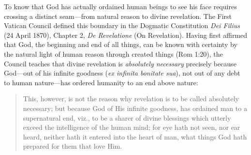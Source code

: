 To know that God has actually ordained human beings to see his face requires crossing a distinct seam---from natural reason to divine revelation. The First Vatican Council defined this boundary in the Dogmatic Constitution \emph{Dei Filius} (24 April 1870), Chapter 2, \emph{De Revelatione} (On Revelation). Having first affirmed that God, the beginning and end of all things, can be known with certainty by the natural light of human reason through created things (Rom 1:20), the Council teaches that divine revelation is \emph{absolutely necessary} precisely because God---out of his infinite goodness (\emph{ex infinita bonitate sua}), not out of any debt to human nature---has ordered humanity to an end above nature:

\begin{quote}
This, however, is not the reason why revelation is to be called absolutely necessary; but because God of His infinite goodness, has ordained man to a supernatural end, viz., to be a sharer of divine blessings which utterly exceed the intelligence of the human mind; for eye hath not seen, nor ear heard, neither hath it entered into the heart of man, what things God hath prepared for them that love Him.
\end{quote}


